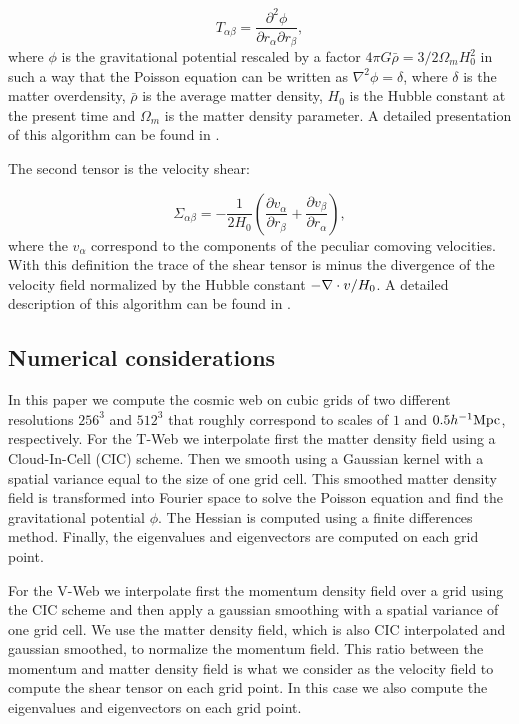 \documentclass[useAMS,usenatbib]{mn2e}
\newcommand{\hMpc}{{\ifmmode{h^{-1}{\rm Mpc}}\else{$h^{-1}$Mpc }\fi}}
\begin{document}
\begin{equation}
T_{\alpha\beta} = \frac{\partial^2\phi}{\partial
  r_{\alpha}\partial r_{\beta}},
\end{equation}
%
where $\phi$ is the gravitational potential rescaled by a factor $4\pi
G\bar{\rho}=3/2\Omega_m H_{0}^2$ in such a way that the Poisson
equation can be written as $\nabla^{2}\phi  = \delta$, where $\delta$
is the matter overdensity, $\bar{\rho}$ is the average matter density,
$H_{0}$ is the Hubble constant at the present time and $\Omega_m$ is the
matter density parameter. A detailed presentation of this algorithm
can be found in \cite{Tweb}.

The second tensor is the velocity shear:

\begin{equation}
\Sigma_{\alpha\beta} = -\frac{1}{2H_{0}}\left(\frac{\partial
  v_{\alpha}}{\partial r_{\beta}}+ \frac{\partial v_{\beta}}{\partial
  r_{\alpha}}\right),
\end{equation}
%
where the $v_{\alpha}$ correspond to the components of the peculiar
comoving velocities. With this definition the trace of the shear
tensor is minus the divergence of the velocity field normalized by the
Hubble constant $-\nabla\cdot {\bf}v /H_{0}$. A detailed description
of this algorithm can be found in \cite{Vweb}.

\subsection{Numerical considerations}

In this paper we compute the cosmic web on cubic grids of two different
resolutions $256^3$ and $512^3$ that roughly correspond
to scales of $1$ and $0.5\hMpc$, respectively. For the T-Web we
interpolate first the matter density field using a Cloud-In-Cell (CIC)
scheme. Then we smooth using a Gaussian kernel with a spatial variance
equal to the size of one grid cell. This smoothed matter density field is
transformed into Fourier space to solve the Poisson equation and find
the gravitational potential $\phi$. The Hessian is computed using a finite
differences method. Finally, the eigenvalues and eigenvectors are
computed on each grid point.

For the V-Web we interpolate first the momentum density field over a
grid using the CIC scheme and then apply a gaussian smoothing with a
spatial variance of one grid cell. We use the matter density field,
which is also CIC interpolated and gaussian smoothed, to normalize the
momentum field. This ratio between the momentum and matter density
field is what we consider as the velocity field to compute the shear
tensor on each grid point. In this case we also compute the
eigenvalues and eigenvectors on each grid point.
\end{document}
